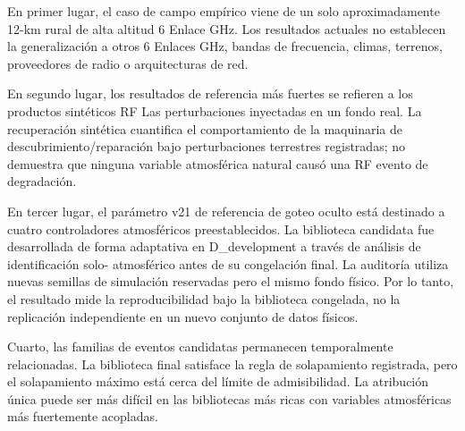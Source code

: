 \documentclass{ieeeaccess}
\begin{document}
En primer lugar, el caso de campo empírico viene de un solo aproximadamente 12-km rural de alta altitud 6 Enlace GHz. Los resultados actuales no establecen la generalización a otros 6 Enlaces GHz, bandas de frecuencia, climas, terrenos, proveedores de radio o arquitecturas de red.

En segundo lugar, los resultados de referencia más fuertes se refieren a los productos sintéticos RF Las perturbaciones inyectadas en un fondo real. La recuperación sintética cuantifica el comportamiento de la maquinaria de descubrimiento/reparación bajo perturbaciones terrestres registradas; no demuestra que ninguna variable atmosférica natural causó una RF evento de degradación.

En tercer lugar, el parámetro v21 de referencia de goteo oculto está destinado a cuatro controladores atmosféricos preestablecidos. La biblioteca candidata fue desarrollada de forma adaptativa en D\_development a través de análisis de identificación solo- atmosférico antes de su congelación final. La auditoría utiliza nuevas semillas de simulación reservadas pero el mismo fondo físico. Por lo tanto, el resultado mide la reproducibilidad bajo la biblioteca congelada, no la replicación independiente en un nuevo conjunto de datos físicos.

Cuarto, las familias de eventos candidatas permanecen temporalmente relacionadas. La biblioteca final satisface la regla de solapamiento registrada, pero el solapamiento máximo está cerca del límite de admisibilidad. La atribución única puede ser más difícil en las bibliotecas más ricas con variables atmosféricas más fuertemente acopladas.
\end{document}
